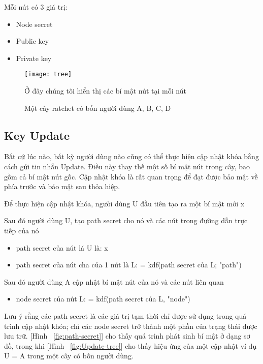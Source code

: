 \documentclass[../main-report.tex]{subfiles}
\begin{document}
Mỗi nút có 3 giá trị:

\begin{itemize}
\item{Node secret}
\item{\gls{Public key}}
\item{\gls{Private key}}
\end{itemize}

\begin{figure}[!h]
\begin{center}
\label{fig:tree}
\texttt{[image: tree]}
\caption{Một cây ratchet có bốn người dùng A, B, C, D}

{Ở đây chúng tôi hiển thị các bí mật nút tại mỗi nút}
\end{center}
\end{figure}

\newpage
\subsection{Key Update}
Bất cứ lúc nào, bất kỳ người dùng nào cũng có thể thực hiện cập nhật khóa bằng cách gửi tin nhắn \gls{Update}. Điều này thay thế một số bí mật nút trong cây, bao gồm cả bí mật nút gốc. Cập nhật khóa là rất quan trọng để đạt được bảo mật về phía trước và bảo mật sau thỏa hiệp.

Để thực hiện cập nhật khóa, người dùng U đầu tiên tạo ra một bí mật mới x

Sau đó người dùng U, tạo path secret cho nó và các nút trong đường dẫn trực tiếp của nó
\begin{itemize}
	\item{path secret của nút lá U là: x}
	\item{path secret của nút cha của 1 nút là L: = \acrshort{kdf}(path secret của L; "path")}
\end{itemize}
Sau đó người dùng A cập nhật bí mật nút của nó và các nút liên quan
\begin{itemize}
	\item{node secret của nút L: = \acrshort{kdf}(path secret của L, "node")}
\end{itemize}

Lưu ý rằng các path secret là các giá trị tạm thời chỉ được sử dụng trong quá trình cập nhật khóa; chỉ các node secret trở thành một phần của trạng thái được lưu trữ. [Hình ~\ref{fig:path-secret}] cho thấy quá trình phát sinh bí mật ở dạng sơ đồ, trong khi [Hình ~\ref{fig:Update-tree}] cho thấy hiệu ứng của một cập nhật ví dụ U = A trong một cây có bốn người dùng.
\end{document}
